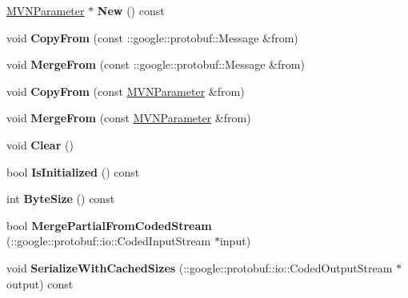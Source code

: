 \begin{DoxyCompactItemize}
\mbox{\hyperlink{classcaffe_1_1_m_v_n_parameter}{M\+V\+N\+Parameter}} $\ast$ {\bfseries New} () const
\item 
\mbox{\label{classcaffe_1_1_m_v_n_parameter_a9009f2ee10768d8de17dc930974b74b3}} 
void {\bfseries Copy\+From} (const \+::google\+::protobuf\+::\+Message \&from)
\item 
\mbox{\label{classcaffe_1_1_m_v_n_parameter_ab437939d137c1d278521aca9250eabc7}} 
void {\bfseries Merge\+From} (const \+::google\+::protobuf\+::\+Message \&from)
\item 
\mbox{\label{classcaffe_1_1_m_v_n_parameter_a94264d035baad4d897f271d370fd49c5}} 
void {\bfseries Copy\+From} (const \mbox{\hyperlink{classcaffe_1_1_m_v_n_parameter}{M\+V\+N\+Parameter}} \&from)
\item 
\mbox{\label{classcaffe_1_1_m_v_n_parameter_a34f5c9a8268ef757f5627df24ec8604b}} 
void {\bfseries Merge\+From} (const \mbox{\hyperlink{classcaffe_1_1_m_v_n_parameter}{M\+V\+N\+Parameter}} \&from)
\item 
\mbox{\label{classcaffe_1_1_m_v_n_parameter_af7886746c0645591bd7de14f47702d83}} 
void {\bfseries Clear} ()
\item 
\mbox{\label{classcaffe_1_1_m_v_n_parameter_adf0d700b3512ae01265b6abd88c912f8}} 
bool {\bfseries Is\+Initialized} () const
\item 
\mbox{\label{classcaffe_1_1_m_v_n_parameter_aa7c16f9a1999818f0f91c54a56971558}} 
int {\bfseries Byte\+Size} () const
\item 
\mbox{\label{classcaffe_1_1_m_v_n_parameter_a88ee4806a8b7a2878ede4550cef48a43}} 
bool {\bfseries Merge\+Partial\+From\+Coded\+Stream} (\+::google\+::protobuf\+::io\+::\+Coded\+Input\+Stream $\ast$input)
\item 
\mbox{\label{classcaffe_1_1_m_v_n_parameter_abc546802ce860ad43fff628a3ae7aabc}} 
void {\bfseries Serialize\+With\+Cached\+Sizes} (\+::google\+::protobuf\+::io\+::\+Coded\+Output\+Stream $\ast$output) const

\end{DoxyCompactItemize}

